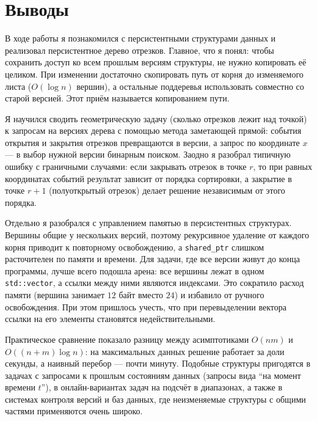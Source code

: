 \section{Выводы}
В ходе работы я познакомился с персистентными структурами данных и реализовал персистентное дерево отрезков.
Главное, что я понял: чтобы сохранить доступ ко всем прошлым версиям структуры, не нужно копировать её целиком.
При изменении достаточно скопировать путь от корня до изменяемого листа ($O(\log n)$ вершин), а остальные поддеревья
использовать совместно со старой версией. Этот приём называется копированием пути.

Я научился сводить геометрическую задачу (сколько отрезков лежит над точкой) к запросам на версиях дерева с
помощью метода заметающей прямой: события открытия и закрытия отрезков превращаются в версии, а запрос по
координате $x$ --- в выбор нужной версии бинарным поиском. Заодно я разобрал типичную ошибку с граничными случаями: если
закрывать отрезок в точке $r$, то при равных координатах событий результат зависит от порядка сортировки, а
закрытие в точке $r + 1$ (полуоткрытый отрезок) делает решение независимым от этого порядка.

Отдельно я разобрался с управлением памятью в персистентных структурах. Вершины общие у нескольких версий,
поэтому рекурсивное удаление от каждого корня приводит к повторному освобождению, а \texttt{shared\_ptr} слишком
расточителен по памяти и времени. Для задачи, где все версии живут до конца программы, лучше всего подошла арена:
все вершины лежат в одном \texttt{std::vector}, а ссылки между ними являются индексами. Это сократило расход
памяти (вершина занимает $12$ байт вместо $24$) и избавило от ручного освобождения. При этом пришлось учесть,
что при перевыделении вектора ссылки на его элементы становятся недействительными.

Практическое сравнение показало разницу между асимптотиками $O(nm)$ и $O((n + m)\log n)$: на максимальных
данных решение работает за доли секунды, а наивный перебор --- почти минуту. Подобные структуры пригодятся в
задачах с запросами к прошлым состояниям данных (запросы вида \enquote{на момент времени $t$}), в онлайн-вариантах
задач на подсчёт в диапазонах, а также в системах контроля версий и
баз данных, где неизменяемые структуры с общими частями применяются очень широко.

\pagebreak
